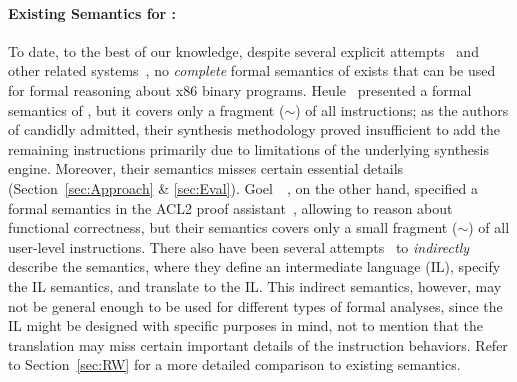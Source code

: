 \paragraph{Existing Semantics for \ISA:}
%
To date, to the best of our knowledge, despite several explicit attempts~\cite{Heule2016a,Goel:FMCAD14,Goel:ProCoS17,Goel:VTTE13:ACP:2958657.2958669} and other related systems~\cite{Leroy:2009,Remill,TSL:TOPLAS13,Hasabnis:ASPLOS16,Hasabnis:FSE16},
no \emph{complete} formal semantics of \ISA exists that can be used for formal reasoning about x86 binary programs.
%
Heule~\etal \cite{Heule2016a} presented a formal semantics of \ISA, but it covers only a fragment ($\sim$\strataPerc{}) of all instructions; as the authors of \cite{Heule2016a} candidly admitted, their synthesis methodology proved insufficient to add the remaining instructions primarily due to limitations of the underlying synthesis engine. 
%
Moreover, their semantics misses certain essential details (Section~\ref{sec:Approach} \& \ref{sec:Eval}).
%
%
Goel~\etal~\cite{Goel:FMCAD14,Goel:ProCoS17,Goel:VTTE13:ACP:2958657.2958669}, on the other hand, specified a formal semantics in the ACL2 proof assistant~\cite{ACL2:Kaufmann2000}, allowing to reason about functional correctness, but their semantics covers only a small fragment ($\sim$\goelPerc{}) of all user-level instructions.
%
There also have been several attempts~\cite{Angr1,BAP:CAV11,Radare2,Hasabnis:FSE16} to \emph{indirectly} describe the \ISA semantics, where they define an intermediate language (IL), specify the IL semantics, and translate \ISA to the IL.
This indirect semantics, however, may not be general enough to be used for different types of formal analyses, since the IL might be designed with specific purposes in mind, not to mention that the translation may miss certain important details of the instruction behaviors.
%
Refer to Section~\ref{sec:RW} for a more detailed comparison to existing semantics.

